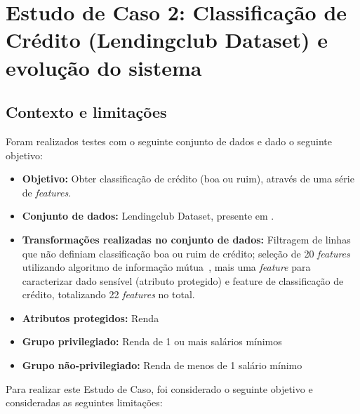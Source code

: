 \documentclass[portugues]{ic-tese}
\begin{document}
\chapter{Estudo de Caso 2: Classificação de Crédito (Lendingclub Dataset) e evolução do sistema}

\section{Contexto e limitações}

Foram realizados testes com o seguinte conjunto de dados e dado o seguinte objetivo:

\begin{itemize}
\item \textbf{Objetivo:} Obter classificação de crédito (boa ou ruim), através de uma série de \textit{features}.

\item \textbf{Conjunto de dados:} Lendingclub Dataset, presente em \citep{lendingclub_2022}.

\item \textbf{Transformações realizadas no conjunto de dados:} Filtragem de linhas que não definiam classificação boa ou ruim de crédito; seleção de 20 \textit{features} utilizando algoritmo de informação mútua~\citep{Ross_2014}, mais uma \textit{feature} para caracterizar dado sensível (atributo protegido) e feature de classificação de crédito, totalizando 22 \textit{features} no total.

\item \textbf{Atributos protegidos:} Renda

\item \textbf{Grupo privilegiado:} Renda de 1 ou mais salários mínimos

\item \textbf{Grupo não-privilegiado:} Renda de menos de 1 salário mínimo

\end{itemize}

Para realizar este Estudo de Caso, foi considerado o seguinte objetivo e consideradas as seguintes limitações:
\end{document}
